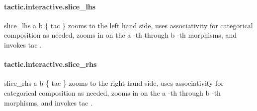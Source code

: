\documentclass{article}
\begin{document}
\paragraph{tactic.interactive.slice\_lhs}
\par
\colorbox[RGB]{253,246,227}{{{{\color[RGB]{101, 123, 131} slice\_lhs a b \{ tac \} }}}} zooms to the left hand side, uses associativity for categorical
composition as needed, zooms in on the 
\colorbox[RGB]{253,246,227}{{{{\color[RGB]{101, 123, 131} a }}}}-th through 
\colorbox[RGB]{253,246,227}{{{{\color[RGB]{101, 123, 131} b }}}}-th morphisms, and invokes 
\colorbox[RGB]{253,246,227}{{{{\color[RGB]{101, 123, 131} tac }}}}.
\paragraph{tactic.interactive.slice\_rhs}
\par
\colorbox[RGB]{253,246,227}{{{{\color[RGB]{101, 123, 131} slice\_rhs a b \{ tac \} }}}} zooms to the right hand side, uses associativity for categorical
composition as needed, zooms in on the 
\colorbox[RGB]{253,246,227}{{{{\color[RGB]{101, 123, 131} a }}}}-th through 
\colorbox[RGB]{253,246,227}{{{{\color[RGB]{101, 123, 131} b }}}}-th morphisms, and invokes 
\colorbox[RGB]{253,246,227}{{{{\color[RGB]{101, 123, 131} tac }}}}.
\end{document}
